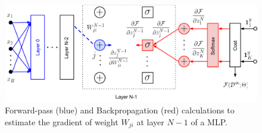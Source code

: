 \begin{figure}[!h]
\centering
\includegraphics[scale=0.6]{figs/deep_learning/NN_backprop_colored2.pdf}
\caption{Forward-pass (blue) and Backpropagation (red) calculations to estimate the gradient of weight $W_{ji}$ at layer $N-1$ of a MLP.}
\label{fig:NN_color}
\end{figure}

